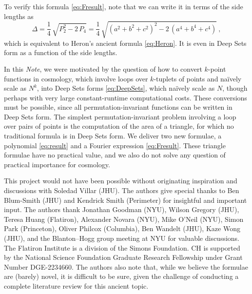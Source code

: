 \documentclass[10pt]{article}
\newcommand{\documentname}{\textsl{Note}}
\newcommand{\secbreak}{\bigskip{\centering\footnotesize $\triangle~~~\triangle~~~\triangle$\par}\bigskip\noindent}
\begin{document}
To verify this formula \eqref{eq:Fresult}, note that we can write it in terms of the side lengths as
\begin{equation}
\label{eq:HeronDeepSets}
    \Delta = \frac{1}{4} \, \sqrt{
        P_2^2
        - 2 \, P_4
    }
    = \frac{1}{4} \, \sqrt{
        \left( a^2 + b^2 + c^2 \right)^2
        - 2 \, \left( a^4 + b^4 + c^4 \right)
    }~,
\end{equation}
which is equivalent to Heron's ancient formula \eqref{eq:Heron}.
It is even in Deep Sets form as a function of the side lengths.

\secbreak
In this \documentname, we were motivated by the question of how to convert $k$-point functions in cosmology, which involve loops over $k$-tuplets of points and na\"ively scale as $N^k$, into Deep Sets forms \eqref{eq:DeepSets}, which na\"ively scale as $N$, though perhaps with very large constant-runtime computational costs.
These conversions must be possible, since all permutation-invariant functions can be written in Deep Sets form.
The simplest permutation-invariant problem involving a loop over pairs of points is the computation of the area of a triangle, for which no traditional formula is in Deep Sets form.
We deliver two new formulae, a polynomial \eqref{eq:result} and a Fourier expression \eqref{eq:Fresult}.
These triangle formulae have no practical value, and we also do not solve any question of practical importance for cosmology.



{\footnotesize\par\bigskip\noindent
This project would not have been possible without originating inspiration and discussions with Soledad Villar (JHU).
The authors give special thanks to Ben Blum-Smith (JHU) and Kendrick Smith (Perimeter) for insightful and important input.
The authors thank
  Jonathan Goodman (NYU),
  Wilson Gregory (JHU),
  Teresa Huang (Flatiron),
  Alexander Novara (NYU),
  Mike O'Neil (NYU),
  Simon Park (Princeton),
  Oliver Philcox (Columbia),
  Ben Wandelt (JHU),
  Kaze Wong (JHU),
and the Blanton--Hogg group meeting at NYU for valuable discussions.
The Flatiron Institute is a division of the Simons Foundation.
CH is supported by the National Science Foundation Graduate Research Fellowship under Grant Number DGE-2234660.
The authors also note that, while we believe the formulae are (barely) novel, it is difficult to be sure, given the challenge of conducting a complete literature review for this ancient topic.\par}
\end{document}
